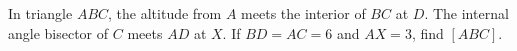 In triangle $ABC$, the altitude from $A$ meets the interior of $BC$ at $D$. The internal angle bisector of $C$ meets $AD$ at $X$. If $BD=AC=6$ and $AX=3$, find $[ABC]$.
